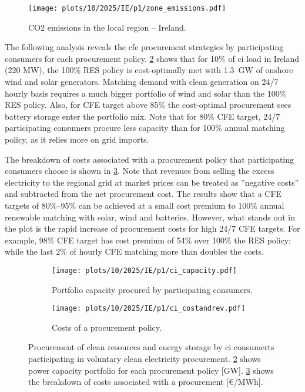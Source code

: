 \begin{figure}
    \centering
    \texttt{[image: plots/10/2025/IE/p1/zone\_emissions.pdf]}
    \caption{CO2 emissions in the local region -- Ireland.}
    \label{fig:10-2025-IE-p1-zone_emissions}
\end{figure}

The following analysis reveals the \gls{cfe} procurement strategies by participating consumers for each procurement policy.
\cref{fig:10-2025-IE-p1-ci_capacity} shows that for 10\% of \gls{ci} load in Ireland (220 MW), the 100\% RES policy is cost-optimally met with 1.3~GW of onshore wind and solar generators.
Matching demand with clean generation on 24/7 hourly basis requires a much bigger portfolio of wind and solar than the 100\% RES policy.
Also, for CFE target above 85\% the cost-optimal procurement sees battery storage enter the portfolio mix.
Note that for 80\% CFE target, 24/7 participating consumers procure less capacity than for 100\% annual matching policy, as it relies more on grid imports.

The breakdown of costs associated with a procurement policy that participating consumers choose is shown in \cref{fig:10-2025-IE-p1-ci_costandrev}.
Note that revenues from selling the excess electricity to the regional grid at market prices can be treated as ”negative costs” and subtracted from the net procurement cost.
The results show that a CFE targets of 80\%--95\% can be achieved at a small cost premium to 100\% annual renewable matching with solar, wind and batteries.
However, what stands out in the plot is the rapid increase of procurement costs for high 24/7 CFE targets. 
For example, 98\% CFE target has cost premium of 54\% over 100\% the RES policy; while the last 2\% of hourly CFE matching more than doubles the costs.


\begin{figure}
    \centering
    \begin{subfigure}[t]{\columnwidth}
        \centering
        \caption{Portfolio capacity procured by participating consumers.}
        \texttt{[image: plots/10/2025/IE/p1/ci\_capacity.pdf]}
        \label{fig:10-2025-IE-p1-ci_capacity}
    \end{subfigure}
    \begin{subfigure}[t]{\columnwidth}
        \centering
        \vspace{-0.5cm}
        \caption{Costs of a procurement policy.}
        \texttt{[image: plots/10/2025/IE/p1/ci\_costandrev.pdf]}
        \label{fig:10-2025-IE-p1-ci_costandrev}
    \end{subfigure}
    \caption{Procurement of clean resources and energy storage by \gls{ci} consumerts participating in voluntary clean electricity procurement. 
    \cref{fig:10-2025-IE-p1-ci_capacity} shows power capacity portfolio for each procurement policy [GW].
    \cref{fig:10-2025-IE-p1-ci_costandrev} shows the breakdown of costs associated with a procurement [\euro/MWh].}
    \label{fig:10-2025-IE-p1-ci_procurement}
\end{figure}


